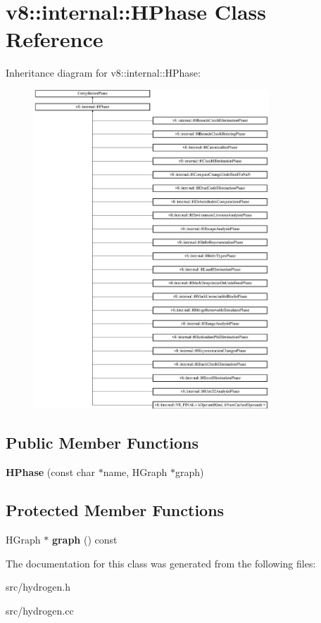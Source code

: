 \hypertarget{classv8_1_1internal_1_1_h_phase}{}\section{v8\+:\+:internal\+:\+:H\+Phase Class Reference}
\label{classv8_1_1internal_1_1_h_phase}
Inheritance diagram for v8\+:\+:internal\+:\+:H\+Phase\+:\begin{figure}[H]
\begin{center}
\leavevmode
\includegraphics[height=12.000000cm]{classv8_1_1internal_1_1_h_phase}
\end{center}
\end{figure}
\subsection*{Public Member Functions}
\begin{DoxyCompactItemize}
\item 
\hypertarget{classv8_1_1internal_1_1_h_phase_ab39235a15a89368c007c5c90e7bd470f}{}{\bfseries H\+Phase} (const char $\ast$name, H\+Graph $\ast$graph)\label{classv8_1_1internal_1_1_h_phase_ab39235a15a89368c007c5c90e7bd470f}

\end{DoxyCompactItemize}
\subsection*{Protected Member Functions}
\begin{DoxyCompactItemize}
\item 
\hypertarget{classv8_1_1internal_1_1_h_phase_aa95b948e95c56fbff4a36748d00a4d8c}{}H\+Graph $\ast$ {\bfseries graph} () const \label{classv8_1_1internal_1_1_h_phase_aa95b948e95c56fbff4a36748d00a4d8c}

\end{DoxyCompactItemize}


The documentation for this class was generated from the following files\+:\begin{DoxyCompactItemize}
\item 
src/hydrogen.\+h\item 
src/hydrogen.\+cc\end{DoxyCompactItemize}
